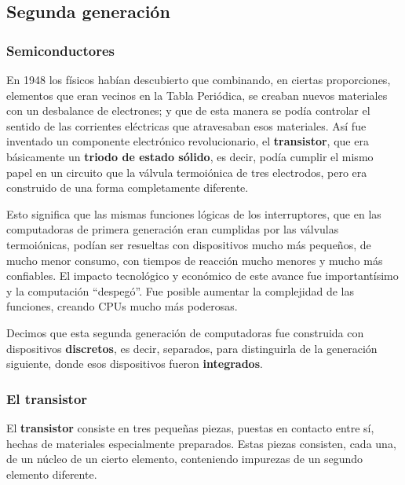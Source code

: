 \documentclass[spanish,a4paper,]{article}
\begin{document}
\hypertarget{segunda-generaciuxf3n}{%
\subsection{Segunda generación}\label{segunda-generaciuxf3n}}

\hypertarget{semiconductores}{%
\subsubsection{Semiconductores}\label{semiconductores}}

En 1948 los físicos habían descubierto que combinando, en ciertas
proporciones, elementos que eran vecinos en la Tabla Periódica, se
creaban nuevos materiales con un desbalance de electrones; y que de esta
manera se podía controlar el sentido de las corrientes eléctricas que
atravesaban esos materiales. Así fue inventado un componente electrónico
revolucionario, el \textbf{transistor}, que era básicamente un
\textbf{triodo de estado sólido}, es decir, podía cumplir el mismo papel
en un circuito que la válvula termoiónica de tres electrodos, pero era
construido de una forma completamente diferente.

Esto significa que las mismas funciones lógicas de los interruptores,
que en las computadoras de primera generación eran cumplidas por las
válvulas termoiónicas, podían ser resueltas con dispositivos mucho más
pequeños, de mucho menor consumo, con tiempos de reacción mucho menores
y mucho más confiables. El impacto tecnológico y económico de este
avance fue importantísimo y la computación ``despegó''. Fue posible
aumentar la complejidad de las funciones, creando CPUs mucho más
poderosas.

Decimos que esta segunda generación de computadoras fue construida con
dispositivos \textbf{discretos}, es decir, separados, para distinguirla
de la generación siguiente, donde esos dispositivos fueron
\textbf{integrados}.

\hypertarget{el-transistor}{%
\subsubsection{El transistor}\label{el-transistor}}

El \textbf{transistor} consiste en tres pequeñas piezas, puestas en
contacto entre sí, hechas de materiales especialmente preparados. Estas
piezas consisten, cada una, de un núcleo de un cierto elemento,
conteniendo impurezas de un segundo elemento diferente.
\end{document}

